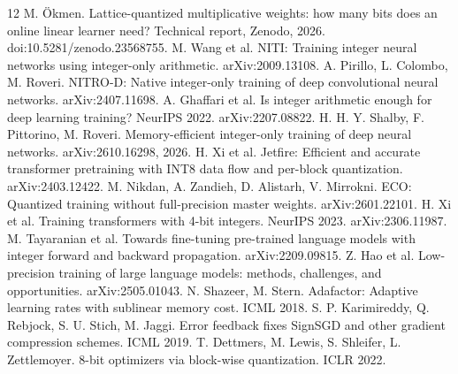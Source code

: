 \documentclass[11pt]{article}
\begin{document}
\begin{thebibliography}{12}
 M. \"Okmen. Lattice-quantized multiplicative weights: how many bits does an online linear learner need? Technical report, Zenodo, 2026. doi:10.5281/zenodo.23568755.
 M. Wang et al. NITI: Training integer neural networks using integer-only arithmetic. arXiv:2009.13108.
 A. Pirillo, L. Colombo, M. Roveri. NITRO-D: Native integer-only training of deep convolutional neural networks. arXiv:2407.11698.
 A. Ghaffari et al. Is integer arithmetic enough for deep learning training? NeurIPS 2022. arXiv:2207.08822.
 H. H. Y. Shalby, F. Pittorino, M. Roveri. Memory-efficient integer-only training of deep neural networks. arXiv:2610.16298, 2026.
 H. Xi et al. Jetfire: Efficient and accurate transformer pretraining with INT8 data flow and per-block quantization. arXiv:2403.12422.
 M. Nikdan, A. Zandieh, D. Alistarh, V. Mirrokni. ECO: Quantized training without full-precision master weights. arXiv:2601.22101.
 H. Xi et al. Training transformers with 4-bit integers. NeurIPS 2023. arXiv:2306.11987.
 M. Tayaranian et al. Towards fine-tuning pre-trained language models with integer forward and backward propagation. arXiv:2209.09815.
 Z. Hao et al. Low-precision training of large language models: methods, challenges, and opportunities. arXiv:2505.01043.
 N. Shazeer, M. Stern. Adafactor: Adaptive learning rates with sublinear memory cost. ICML 2018.
 S. P. Karimireddy, Q. Rebjock, S. U. Stich, M. Jaggi. Error feedback fixes SignSGD and other gradient compression schemes. ICML 2019.
 T. Dettmers, M. Lewis, S. Shleifer, L. Zettlemoyer. 8-bit optimizers via block-wise quantization. ICLR 2022.
\end{thebibliography}
\end{document}
